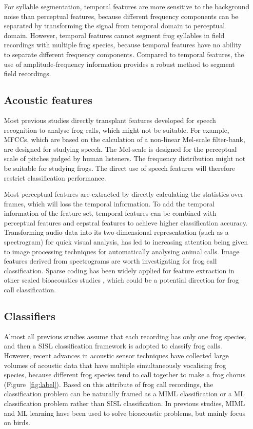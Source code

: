 For syllable segmentation, temporal features are more sensitive to  the background noise than perceptual features, because different frequency components can be separated by transforming the signal from temporal domain to perceptual domain. However, temporal features cannot segment  frog syllables in field recordings with multiple frog species, because temporal features have no ability to separate different frequency components. Compared to temporal features, the use of amplitude-frequency information provides a robust method to segment field recordings. 




\subsection{Acoustic features}
Most previous studies directly transplant features developed for speech recognition to analyse frog calls, which might not be suitable. For example, MFCCs, which are based on the calculation of a non-linear Mel-scale filter-bank, are designed for studying speech. The Mel-scale is designed for the perceptual scale of pitches judged by human listeners. The frequency distribution might not be suitable for studying frogs. The direct use of speech features will therefore restrict classification performance. 

Most perceptual features are extracted by directly calculating the statistics over frames, which will loss the temporal information. To add the temporal information of the feature set, temporal features can be combined with perceptual features and cepstral features to achieve higher classification accuracy. Transforming audio data into its two-dimensional representation (such as a spectrogram) for quick visual analysis, has led to increasing attention being given to image processing techniques for automatically analysing animal calls. Image features derived from spectrograms are worth investigating for frog call classification. Sparse coding has been widely applied for feature extraction in other scaled bioacoustics studies \citep{glotin2013sparse, razik2015sparse}, which could be a potential direction for frog call classification.

\subsection{Classifiers}
Almost all previous studies assume that each recording has only one frog species, and then a SISL classification framework is adopted to classify frog calls. However, recent advances in acoustic sensor techniques have collected large volumes of acoustic data that have multiple simultaneously vocalising frog species, because different frog species tend to call together to make a frog chorus (Figure~\ref{fig:label}). Based on this attribute of frog call recordings, the classification problem can be naturally framed as a MIML classification or a ML classification problem rather than SISL classification. In previous studies, MIML and ML learning have been used to solve bioacoustic problems, but mainly focus on birds. 





